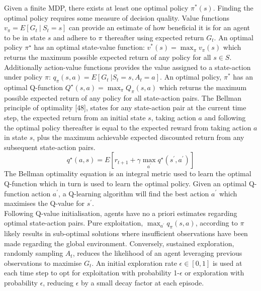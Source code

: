 \documentclass[runningheads]{llncs}
\begin{document}
Given a finite MDP, there exists at least one optimal
policy $\pi^*(s)$. Finding the optimal policy requires some measure of decision quality. Value functions $v_\pi = E \left[G_t \ | \ S_t = s\right]$ can provide an estimate of how beneficial it is for an agent to be in state $s$ and adhere to $\pi$ thereafter using expected return $G_t$. An optimal policy $\pi^\star$ has an optimal state-value function: $v^{*}(s) = \max_\pi v_\pi(s)$ which returns the maximum possible expected return of any policy for all $s \in S$. Additionally action-value functions provides the value assigned to a state-action under policy $\pi$:  $q_\pi(s,a) = E \left[G_t \ | S_t = s, A_t = a \right]$. An optimal policy, $\pi^*$ has an optimal Q-function 
\begin{math}
	Q^\star(s,a) = \max_\pi Q_\pi(s,a)
\end{math} which returns the maximum possible expected return
of any policy for all state-action pairs. The Bellman principle of optimality [48], states for any state-action pair at the current time step, the expected return from an initial state $s$, taking action $a$ and following the optimal policy thereafter is equal to the expected reward from taking action $a$ in state $s$, plus the maximum achievable expected discounted return from any subsequent state-action pairs.
\begin{equation}
	q^\star(a,s) = E \left[r_{t+1} + \gamma \max_{a^\prime} q^\star(s^\prime, a^\prime)\right]
\end{equation}
The Bellman optimality equation is an integral metric used to learn the optimal Q-function which in turn is used to learn the optimal policy. Given an optimal Q-function action $a^{\prime}$, a Q-learning algorithm will find the best action $a^{\prime}$ which maximises the Q-value for $s^{\prime}$. \\

Following Q-value initialisation, agents have no a priori estimates regarding optimal state-action pairs. Pure exploitation, $\max_{a^{\prime}} q_\pi(s,a)$,  according to $\pi$ likely results in sub-optimal solutions where insufficient observations have been made regarding the global environment. Conversely, sustained exploration, randomly sampling $A_t$, reduces the likelihood of an agent leveraging previous observations to maximise $G_t$. An initial exploration rate $\epsilon \in [0,1]$ is used at each time step to opt for exploitation with probability 1-$\epsilon$ or exploration with probability $\epsilon$, reducing $\epsilon$ by a small decay factor at each episode.
\end{document}
